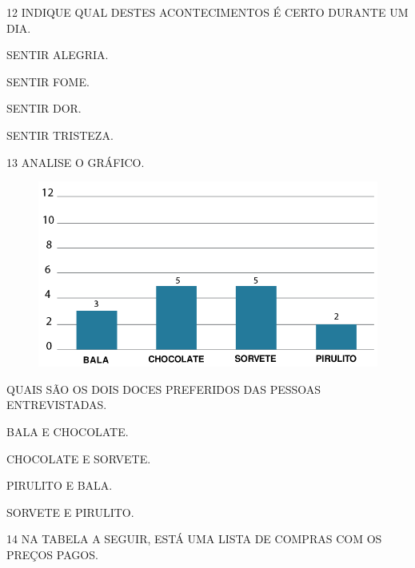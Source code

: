 \vspace{1cm}

\num{12} INDIQUE QUAL DESTES ACONTECIMENTOS É CERTO DURANTE UM DIA.

\begin{escolha}
\item SENTIR ALEGRIA.

\item SENTIR FOME.

\item SENTIR DOR.

\item SENTIR TRISTEZA.
\end{escolha}

\pagebreak
\num{13} ANALISE O GRÁFICO.

\begin{figure}[H]
\includegraphics[width=\textwidth]{./media/SAEB_1ANO_MAT_FIGURA118.png}
\end{figure}

QUAIS SÃO OS DOIS DOCES PREFERIDOS DAS PESSOAS ENTREVISTADAS.

\begin{multicols}{2}
\begin{escolha}[itemsep=0pt]
\item BALA E CHOCOLATE.

\item CHOCOLATE E SORVETE.

\item PIRULITO E BALA.

\item SORVETE E PIRULITO.
\end{escolha}
\end{multicols}

\num{14} NA TABELA A SEGUIR, ESTÁ UMA LISTA DE COMPRAS COM OS PREÇOS PAGOS.

